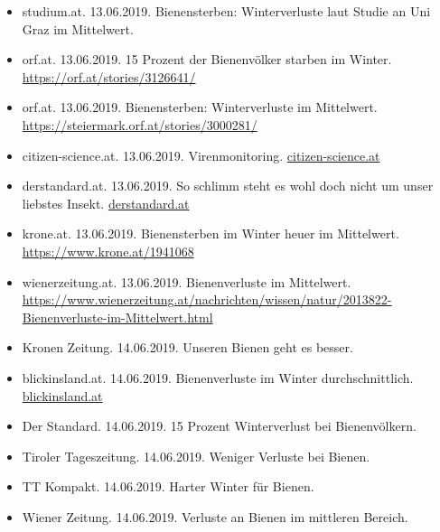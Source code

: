 \begin{itemize}

    \item
    studium.at. 13.06.2019. Bienensterben: Winterverluste laut Studie an Uni Graz im Mittelwert.

    \item
    orf.at. 13.06.2019. 15 Prozent der Bienenvölker starben im Winter. \url{https://orf.at/stories/3126641/}

    \item
    orf.at. 13.06.2019. Bienensterben: Winterverluste im Mittelwert. \url{https://steiermark.orf.at/stories/3000281/}

    \item
    citizen-science.at. 13.06.2019. Virenmonitoring. \href{https://www.citizen-science.at/citizen-scienceprojekte/item/448-virenmonitoring}{citizen-science.at}

    \item
    derstandard.at. 13.06.2019. So schlimm steht es wohl doch nicht um unser liebstes Insekt. \href{https://www.derstandard.at/story/2000104810957/so-schlimm-steht-es-um-unser-liebstes-insekt-wohl-doch}{derstandard.at}

    \item
    krone.at. 13.06.2019. Bienensterben im Winter heuer im Mittelwert. \url{https://www.krone.at/1941068}

    \item
    wienerzeitung.at. 13.06.2019. Bienenverluste im Mittelwert. \url{https://www.wienerzeitung.at/nachrichten/wissen/natur/2013822-Bienenverluste-im-Mittelwert.html}

    \item
    Kronen Zeitung. 14.06.2019. Unseren Bienen geht es besser.

    \item
    blickinsland.at. 14.06.2019. Bienenverluste im Winter durchschnittlich. \href{https://blickinsland.at/bienenverlusteim-winter-durchschnittlich/}{blickinsland.at}

    \item
    Der Standard. 14.06.2019. 15 Prozent Winterverlust bei Bienenvölkern.

    \item
    Tiroler Tageszeitung. 14.06.2019. Weniger Verluste bei Bienen.

    \item
    TT Kompakt. 14.06.2019. Harter Winter für Bienen.

    \item
    Wiener Zeitung. 14.06.2019. Verluste an Bienen im mittleren Bereich.


\end{itemize}
